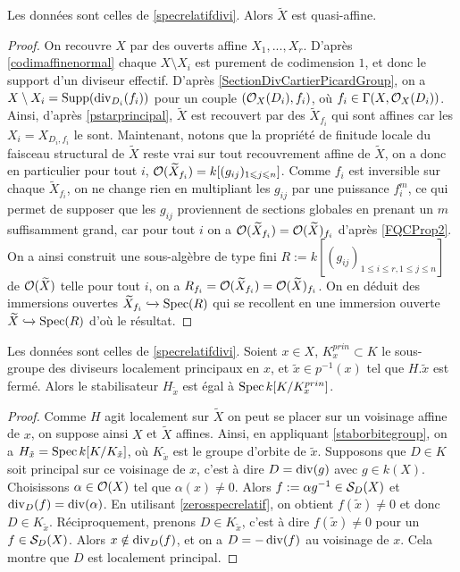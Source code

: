\begin{cor}\label{specrelatifQuasiAff}
Les données sont celles de \ref{specrelatifdivi}. Alors $\widetilde{X}$ est quasi-affine.
\end{cor}
\begin{proof}
On recouvre $X$ par des ouverts affine $X_1,...,X_r$. D'après \ref{codimaffinenormal} chaque $X\setminus X_i$ est purement de codimension $1$, et donc le support d'un diviseur effectif. D'après \ref{SectionDivCartierPicardGroup}, on a $X\setminus X_i=\operatorname{Supp}(\operatorname{div}_{D_i}(f_i))$ pour un couple $(\mathcal{O}_X(D_i),f_i)$, où $f_i\in\Gamma(X,\mathcal{O}_X(D_i))$. Ainsi, d'après \ref{pstarprincipal}, $\widetilde{X}$ est recouvert par des $\widetilde{X}_{f_i}$ qui sont affines car les $X_i=X_{D_i,f_i}$ le sont. Maintenant, notons que la propriété de finitude locale du faisceau structural de $\widetilde{X}$ reste vrai sur tout recouvrement affine de $\widetilde{X}$, on a donc en particulier pour tout $i$, $\mathcal{O}(\widetilde{X}_{f_i})=k[(g_{ij})_{1\leqslant j\leqslant n}]$. Comme $f_i$ est inversible sur chaque $\widetilde{X}_{f_i}$, on ne change rien en multipliant les $g_{ij}$ par une puissance $f_i^m$, ce qui permet de supposer que les $g_{ij}$ proviennent de sections globales en prenant un $m$ suffisamment grand, car pour tout $i$ on a $\mathcal{O}({\widetilde{X}_{f_i}})=\mathcal{O}({\widetilde{X}})_{f_i}$ d'après \ref{FQCProp2}. On a ainsi construit une sous-algèbre de type fini $R:=k[(g_{ij})_{1\leq i\leq r, 1\leq j\leq n}]$ de $\mathcal{O}(\widetilde{X})$ telle pour tout $i$, on a $R_{f_i}=\mathcal{O}({\widetilde{X}_{f_i}})=\mathcal{O}({\widetilde{X}})_{f_i}$. On en déduit des immersions ouvertes $\widetilde{X}_{f_i}\xhookrightarrow{} \operatorname{Spec}(R)$ qui se recollent en une immersion ouverte $\widetilde{X}\xhookrightarrow{} \operatorname{Spec}(R)$ d'où le résultat.
\end{proof}

\begin{cor}
Les données sont celles de \ref{specrelatifdivi}. Soient $x\in X$, $K_x^{prin}\subset K$ le sous-groupe des diviseurs localement principaux en $x$, et $\tilde{x}\in p^{-1}(x)$ tel que $H.\tilde{x}$ est fermé. Alors le stabilisateur $H_{\tilde{x}}$ est égal à $\operatorname{Spec} k[K/K_x^{prin}]$.
\end{cor}
\begin{proof}
Comme $H$ agit localement sur $\widetilde{X}$ on peut se placer sur un voisinage affine de $x$, on suppose ainsi $X$ et $\widetilde{X}$ affines. Ainsi, en appliquant \ref{staborbitegroup}, on a $H_{\tilde{x}}=\operatorname{Spec} k[K/K_{\tilde{x}}]$, où $K_{\tilde{x}}$ est le groupe d'orbite de $\tilde{x}$. Supposons que $D\in K$ soit principal sur ce voisinage de $x$, c'est à dire $D=\operatorname{div}(g)$ avec $g\in k(X)$. Choisissons $\alpha \in \mathcal{O}(X)$ tel que $\alpha(x)\neq 0$. Alors $f:=\alpha g^{-1}\in \mathcal{S}_D(X)$ et $\operatorname{div}_D(f)=\operatorname{div}(\alpha)$. En utilisant \ref{zerosspecrelatif}, on obtient $f(\tilde{x})\neq 0$ et donc $D\in K_{\tilde{x}}$. Réciproquement, prenons $D\in K_{\tilde{x}}$, c'est à dire $f(\tilde{x})\neq 0$ pour un $f\in \mathcal{S}_D(X)$. Alors $x\notin \operatorname{div}_D(f)$, et on a $D=-\operatorname{div}(f)$ au voisinage de $x$. Cela montre que $D$ est localement principal.
\end{proof}




